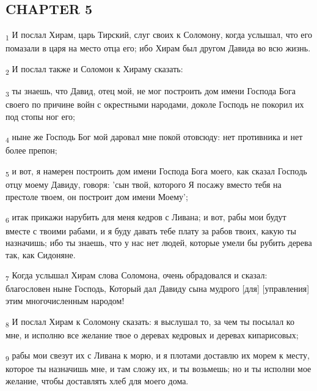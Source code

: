 \subsection{CHAPTER 5}
\begin{tcolorbox}
\textsubscript{1} И послал Хирам, царь Тирский, слуг своих к Соломону, когда услышал, что его помазали в царя на место отца его; ибо Хирам был другом Давида во всю жизнь.
\end{tcolorbox}
\begin{tcolorbox}
\textsubscript{2} И послал также и Соломон к Хираму сказать:
\end{tcolorbox}
\begin{tcolorbox}
\textsubscript{3} ты знаешь, что Давид, отец мой, не мог построить дом имени Господа Бога своего по причине войн с окрестными народами, доколе Господь не покорил их под стопы ног его;
\end{tcolorbox}
\begin{tcolorbox}
\textsubscript{4} ныне же Господь Бог мой даровал мне покой отовсюду: нет противника и нет более препон;
\end{tcolorbox}
\begin{tcolorbox}
\textsubscript{5} и вот, я намерен построить дом имени Господа Бога моего, как сказал Господь отцу моему Давиду, говоря: 'сын твой, которого Я посажу вместо тебя на престоле твоем, он построит дом имени Моему';
\end{tcolorbox}
\begin{tcolorbox}
\textsubscript{6} итак прикажи нарубить для меня кедров с Ливана; и вот, рабы мои будут вместе с твоими рабами, и я буду давать тебе плату за рабов твоих, какую ты назначишь; ибо ты знаешь, что у нас нет людей, которые умели бы рубить дерева так, как Сидоняне.
\end{tcolorbox}
\begin{tcolorbox}
\textsubscript{7} Когда услышал Хирам слова Соломона, очень обрадовался и сказал: благословен ныне Господь, Который дал Давиду сына мудрого [для] [управления] этим многочисленным народом!
\end{tcolorbox}
\begin{tcolorbox}
\textsubscript{8} И послал Хирам к Соломону сказать: я выслушал то, за чем ты посылал ко мне, и исполню все желание твое о деревах кедровых и деревах кипарисовых;
\end{tcolorbox}
\begin{tcolorbox}
\textsubscript{9} рабы мои свезут их с Ливана к морю, и я плотами доставлю их морем к месту, которое ты назначишь мне, и там сложу их, и ты возьмешь; но и ты исполни мое желание, чтобы доставлять хлеб для моего дома.
\end{tcolorbox}
